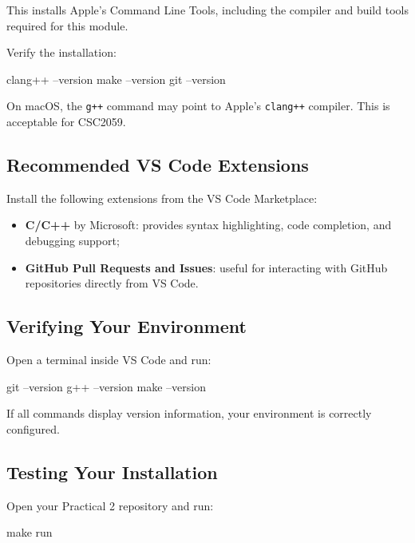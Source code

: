 \documentclass{csc2059practical}
\begin{document}
This installs Apple's Command Line Tools, including the compiler and build tools required for this module.

Verify the installation:

\begin{bashcode}
clang++ --version
make --version
git --version
\end{bashcode}

\begin{tipbox}
On macOS, the \texttt{g++} command may point to Apple's \texttt{clang++} compiler. This is acceptable for CSC2059.
\end{tipbox}

\subsection{Recommended VS Code Extensions}

Install the following extensions from the VS Code Marketplace:

\begin{itemize}
  \item \textbf{C/C++} by Microsoft: provides syntax highlighting, code completion, and debugging support;
  \item \textbf{GitHub Pull Requests and Issues}: useful for interacting with GitHub repositories directly from VS Code.
\end{itemize}

\subsection{Verifying Your Environment}

Open a terminal inside VS Code and run:

\begin{bashcode}
git --version
g++ --version
make --version
\end{bashcode}

If all commands display version information, your environment is correctly configured.

\subsection{Testing Your Installation}

Open your Practical 2 repository and run:

\begin{bashcode}
make run
\end{bashcode}
\end{document}
